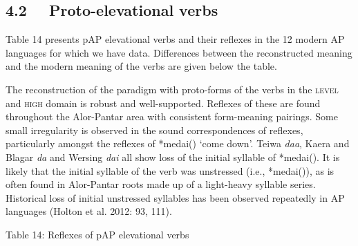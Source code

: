 \subsection[4.2 \ \ Proto{}-elevational verbs]{4.2 \ \ Proto-elevational verbs}
Table 14 presents pAP elevational verbs and their reflexes in the 12 modern AP languages for which we have data. Differences between the reconstructed meaning and the modern meaning of the verbs are given below the table. 

The reconstruction of the paradigm with proto-forms of the verbs in the \textsc{level} and \textsc{high }domain is robust and well-supported. Reflexes of these are found throughout the Alor-Pantar area with consistent form-meaning pairings. Some small irregularity is observed in the sound correspondences of reflexes, particularly amongst the reflexes of *medai({\ng}) {\textquoteleft}come down{\textquoteright}. Teiwa \textit{daa}, Kaera and Blagar \textit{da} and Wersing \textit{dai} all show loss of the initial syllable of *medai({\ng}). It is likely that the initial syllable of the verb was unstressed (i.e., *me{\textprimstress}dai({\ng})), as is often found in Alor-Pantar roots made up of a light-heavy syllable series. Historical loss of initial unstressed syllables has been observed repeatedly in AP languages (Holton et al. 2012: 93, 111).

{\centering
Table 14: Reflexes of pAP elevational verbs
\par}

